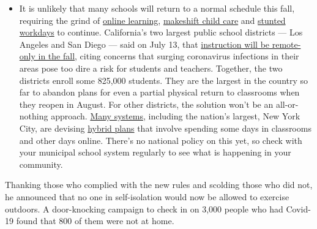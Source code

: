 \begin{itemize}
  \begin{itemize}
  \tightlist
  \item
    It is unlikely that many schools will return to a normal schedule
    this fall, requiring the grind of
    \href{https://www.nytimes3xbfgragh.onion/2020/06/05/us/coronavirus-education-lost-learning.html?action=click\&pgtype=Article\&state=default\&region=MAIN_CONTENT_3\&context=storylines_faq}{online
    learning},
    \href{https://www.nytimes3xbfgragh.onion/2020/05/29/us/coronavirus-child-care-centers.html?action=click\&pgtype=Article\&state=default\&region=MAIN_CONTENT_3\&context=storylines_faq}{makeshift
    child care} and
    \href{https://www.nytimes3xbfgragh.onion/2020/06/03/business/economy/coronavirus-working-women.html?action=click\&pgtype=Article\&state=default\&region=MAIN_CONTENT_3\&context=storylines_faq}{stunted
    workdays} to continue. California's two largest public school
    districts --- Los Angeles and San Diego --- said on July 13, that
    \href{https://www.nytimes3xbfgragh.onion/2020/07/13/us/lausd-san-diego-school-reopening.html?action=click\&pgtype=Article\&state=default\&region=MAIN_CONTENT_3\&context=storylines_faq}{instruction
    will be remote-only in the fall}, citing concerns that surging
    coronavirus infections in their areas pose too dire a risk for
    students and teachers. Together, the two districts enroll some
    825,000 students. They are the largest in the country so far to
    abandon plans for even a partial physical return to classrooms when
    they reopen in August. For other districts, the solution won't be an
    all-or-nothing approach.
    \href{https://bioethics.jhu.edu/research-and-outreach/projects/eschool-initiative/school-policy-tracker/}{Many
    systems}, including the nation's largest, New York City, are
    devising
    \href{https://www.nytimes3xbfgragh.onion/2020/06/26/us/coronavirus-schools-reopen-fall.html?action=click\&pgtype=Article\&state=default\&region=MAIN_CONTENT_3\&context=storylines_faq}{hybrid
    plans} that involve spending some days in classrooms and other days
    online. There's no national policy on this yet, so check with your
    municipal school system regularly to see what is happening in your
    community.
  \end{itemize}
\end{itemize}

Thanking those who complied with the new rules and scolding those who
did not, he announced that no one in self-isolation would now be allowed
to exercise outdoors. A door-knocking campaign to check in on 3,000
people who had Covid-19 found that 800 of them were not at home.

